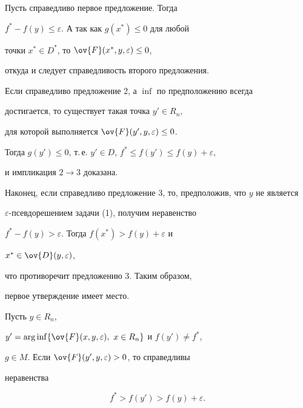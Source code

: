\begin{pf}


Пусть справедливо первое предложение. Тогда


$f^*-f(y)\le \varepsilon$. А так как $g(x^*)\le 0$ для любой


точки $x^*\in D^*$, то $\ov{F}(x^*,y,\varepsilon)\le 0$,


откуда и следует справедливость второго предложения.





Если справедливо предложение 2, а $\inf$ по предположению всегда


достигается, то существует такая точка $y'\in R_n$,


для которой выполняется $\ov{F}(y',y,\varepsilon)\le 0$.


Тогда $g(y')\le 0$, т.\,е. $y'\in D$, $f^*\le f(y')\le f(y)+\varepsilon$,


и импликация $2\rightarrow3$ доказана. 





Наконец, если справедливо предложение 3, то, предположив, что $y$ не является


$\varepsilon$-псев\-до\-ре\-ше\-нием задачи (1), получим неравенство


$f^*-f(y)>\varepsilon$. Тогда $f(x^*)>f(y)+\varepsilon$ и


$x^*\in \ov{D}(y,\varepsilon)$,


что противоречит предложению 3. Таким образом,


первое утверждение имеет место.


\end{pf}





\begin{lem} Пусть $y\in R_n$, 


$y'=\arginf\{\ov{F}(x,y,\varepsilon),\ x\in R_n\}$ и $f(y')\ne f^*$,


$g\in M$. Если $\ov{F}(y',y,\varepsilon)>0$, то справедливы


неравенства


\begin{equation}


f^*>f(y')>f(y)+\varepsilon.


\end{equation}


\end{lem}





